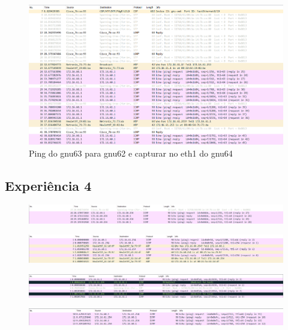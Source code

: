 \documentclass[article, a4paper, 11pt, oneside]{memoir}
\begin{document}
\begin{figure}[h]
	\centering
\includegraphics[scale=0.55]{exp3-step10-ping-gnu62-from-gnu63-eth1.png}
\caption{Ping do gnu63 para gnu62 e capturar no eth1 do gnu64}
\end{figure}

\subsection{Experiência 4}
\begin{figure}[h]
	\centering
\includegraphics[scale=0.40]{exp4-step3-ping-gnu64-from-gnu63.png}
\caption{}
\end{figure}

\begin{figure}[h]
	\centering
\includegraphics[scale=0.55]{exp4-step3-ping-ROUTER-from-gnu63.png}
\caption{}
\end{figure}

\begin{figure}[h]
	\centering
\includegraphics[scale=0.55]{exp4-step4-ping-gnu63-from-gnu62.png}
\caption{}
\end{figure}

\begin{figure}[h]
	\centering
\includegraphics[scale=0.55]{exp4-step7.png}
\caption{}
\end{figure}
\end{document}
